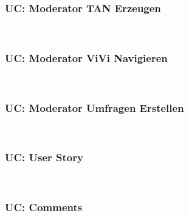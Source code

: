 \subsubsection{UC: Moderator TAN Erzeugen}

\\[0.5cm]
\pagebreak

\subsubsection{UC: Moderator ViVi Navigieren}

\\[0.5cm]
\pagebreak

\subsubsection{UC: Moderator Umfragen Erstellen}

\\[0.5cm]
\pagebreak

\subsubsection{UC: User Story}

\\[0.5cm]
\pagebreak

\subsubsection{UC: Comments}

\\[0.5cm]
\pagebreak